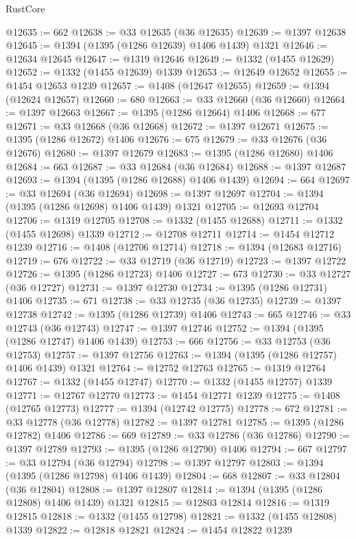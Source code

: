 \begin{lexlean}{RustCore}
\begin{coremodule}
@12635 := 662
@12638 := @33 @12635 (@36 @12635)
@12639 := @1397 @12638
@12645 := @1394 (@1395 (@1286 @12639) @1406 @1439) @1321
@12646 := @12634 @12645
@12647 := @1319 @12646
@12649 := @1332 (@1455 @12629)
@12652 := @1332 (@1455 @12639) @1339
@12653 := @12649 @12652
@12655 := @1454 @12653 @1239
@12657 := @1408 (@12647 @12655)
@12659 := @1394 (@12624 @12657)
@12660 := 680
@12663 := @33 @12660 (@36 @12660)
@12664 := @1397 @12663
@12667 := @1395 (@1286 @12664) @1406
@12668 := 677
@12671 := @33 @12668 (@36 @12668)
@12672 := @1397 @12671
@12675 := @1395 (@1286 @12672) @1406
@12676 := 675
@12679 := @33 @12676 (@36 @12676)
@12680 := @1397 @12679
@12683 := @1395 (@1286 @12680) @1406
@12684 := 663
@12687 := @33 @12684 (@36 @12684)
@12688 := @1397 @12687
@12693 := @1394 (@1395 (@1286 @12688) @1406 @1439)
@12694 := 664
@12697 := @33 @12694 (@36 @12694)
@12698 := @1397 @12697
@12704 := @1394 (@1395 (@1286 @12698) @1406 @1439) @1321
@12705 := @12693 @12704
@12706 := @1319 @12705
@12708 := @1332 (@1455 @12688)
@12711 := @1332 (@1455 @12698) @1339
@12712 := @12708 @12711
@12714 := @1454 @12712 @1239
@12716 := @1408 (@12706 @12714)
@12718 := @1394 (@12683 @12716)
@12719 := 676
@12722 := @33 @12719 (@36 @12719)
@12723 := @1397 @12722
@12726 := @1395 (@1286 @12723) @1406
@12727 := 673
@12730 := @33 @12727 (@36 @12727)
@12731 := @1397 @12730
@12734 := @1395 (@1286 @12731) @1406
@12735 := 671
@12738 := @33 @12735 (@36 @12735)
@12739 := @1397 @12738
@12742 := @1395 (@1286 @12739) @1406
@12743 := 665
@12746 := @33 @12743 (@36 @12743)
@12747 := @1397 @12746
@12752 := @1394 (@1395 (@1286 @12747) @1406 @1439)
@12753 := 666
@12756 := @33 @12753 (@36 @12753)
@12757 := @1397 @12756
@12763 := @1394 (@1395 (@1286 @12757) @1406 @1439) @1321
@12764 := @12752 @12763
@12765 := @1319 @12764
@12767 := @1332 (@1455 @12747)
@12770 := @1332 (@1455 @12757) @1339
@12771 := @12767 @12770
@12773 := @1454 @12771 @1239
@12775 := @1408 (@12765 @12773)
@12777 := @1394 (@12742 @12775)
@12778 := 672
@12781 := @33 @12778 (@36 @12778)
@12782 := @1397 @12781
@12785 := @1395 (@1286 @12782) @1406
@12786 := 669
@12789 := @33 @12786 (@36 @12786)
@12790 := @1397 @12789
@12793 := @1395 (@1286 @12790) @1406
@12794 := 667
@12797 := @33 @12794 (@36 @12794)
@12798 := @1397 @12797
@12803 := @1394 (@1395 (@1286 @12798) @1406 @1439)
@12804 := 668
@12807 := @33 @12804 (@36 @12804)
@12808 := @1397 @12807
@12814 := @1394 (@1395 (@1286 @12808) @1406 @1439) @1321
@12815 := @12803 @12814
@12816 := @1319 @12815
@12818 := @1332 (@1455 @12798)
@12821 := @1332 (@1455 @12808) @1339
@12822 := @12818 @12821
@12824 := @1454 @12822 @1239

\end{coremodule}
\end{lexlean}
